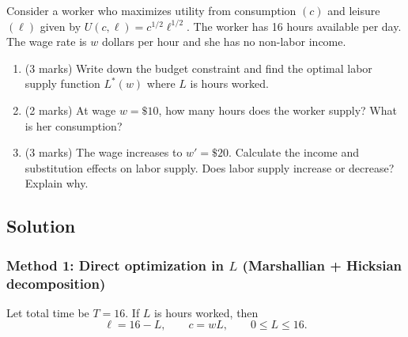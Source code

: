 \documentclass[12pt]{article}
\begin{document}
Consider a worker who maximizes utility from consumption $(c)$ and leisure $(\ell)$ given by $U(c, \ell) = c^{1/2} \ell^{1/2}$. The worker has 16 hours available per day. The wage rate is $w$ dollars per hour and she has no non-labor income.

\begin{enumerate}[label=(\alph*)]
\item (3 marks) Write down the budget constraint and find the optimal labor supply function $L^*(w)$ where $L$ is hours worked.
\item (2 marks) At wage $w = \$10$, how many hours does the worker supply? What is her consumption?
\item (3 marks) The wage increases to $w' = \$20$. Calculate the income and substitution effects on labor supply. Does labor supply increase or decrease? Explain why.
\end{enumerate}

\bigskip

\subsection*{Solution}

\subsubsection*{Method 1: Direct optimization in \(L\) (Marshallian + Hicksian decomposition)}

Let total time be \(T=16\). If \(L\) is hours worked, then
\[
\ell = 16-L,\qquad c=wL,\qquad 0\le L\le 16.
\]
\end{document}
